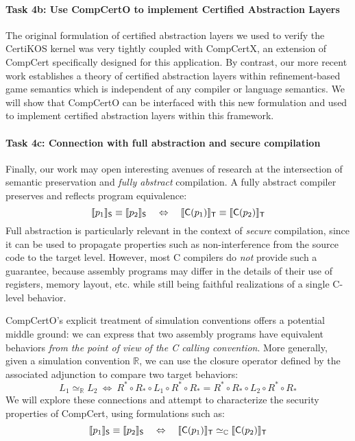 \paragraph*{Task 4b: Use CompCertO to implement Certified Abstraction Layers}

The original formulation of certified abstraction layers
we used to verify the CertiKOS kernel \cite{popl15}
was very tightly coupled with CompCertX,
an extension of CompCert specifically designed for this application.
By contrast,
our more recent work establishes a theory of certified abstraction layers
within refinement-based game semantics
which is independent of any compiler
or language semantics.
We will show that CompCertO can be interfaced with this new formulation
and used to implement certified abstraction layers within this framework.

\paragraph*{Task 4c: Connection with full abstraction and secure compilation} 

Finally,
our work may open interesting avenues of research
at the intersection of
semantic preservation and \emph{fully abstract} compilation.
A fully abstract compiler preserves and reflects program equivalence:
\begin{equation} \label{eqn:fac}
  \llbracket p_1 \rrbracket_{ \mathsf{S} } \equiv
  \llbracket p_2 \rrbracket_{ \mathsf{S} }
  \quad \Leftrightarrow \quad
  \llbracket  \mathsf{C} (p_1) \rrbracket_{ \mathsf{T} } \equiv
  \llbracket  \mathsf{C} (p_2) \rrbracket_{ \mathsf{T} }
\end{equation}
Full abstraction is particularly relevant
in the context of \emph{secure} compilation,
since it can be used to propagate properties such as non-interference
from the source code to the target level.
However,
most C compilers do \emph{not} provide such a guarantee,
because assembly programs may differ in the details
of their use of registers, memory layout, etc.
while still being faithful realizations of a single C-level behavior.

CompCertO's explicit treatment of simulation conventions
offers a potential middle ground:
we can express that two assembly programs
have equivalent behaviors
\emph{from the point of view of the C calling convention}.
More generally,
given a simulation convention $\mathbb{R}$,
we can use the closure operator defined by the associated adjunction
to compare two target behaviors:
\[
  L_1 \simeq_\mathbb{R} L_2 \: \Leftrightarrow \:
  R^* \circ R_* \circ L_1 \circ R^* \circ R_* =
  R^* \circ R_* \circ L_2 \circ R^* \circ R_*
\]
We will explore these connections and attempt to characterize
the security properties of CompCert,
using formulations such as:
\[
  \llbracket p_1 \rrbracket_{ \mathsf{S} } \equiv
  \llbracket p_2 \rrbracket_{ \mathsf{S} }
  \quad \Leftrightarrow \quad
  \llbracket  \mathsf{C} (p_1) \rrbracket_{ \mathsf{T} } \simeq_\mathbb{C}
  \llbracket  \mathsf{C} (p_2) \rrbracket_{ \mathsf{T} }
\]

